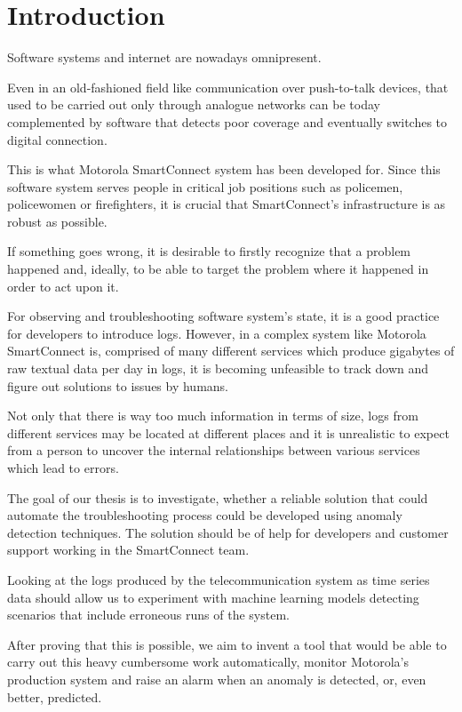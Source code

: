 
\chapter{Introduction}
\label{introduction}

Software systems and internet are nowadays omnipresent.

Even in an old-fashioned field like communication over push-to-talk devices, that used to be carried out only through analogue networks can be today complemented by software that detects poor coverage and eventually switches to digital connection. 

This is what Motorola SmartConnect system has been developed for. Since this software system serves people in critical job positions such as policemen, policewomen or firefighters, it is crucial that SmartConnect's infrastructure is as robust as possible.

If something goes wrong, it is desirable to firstly recognize that a problem happened and, ideally, to be able to target the problem where it happened in order to act upon it.

For observing and troubleshooting software system's state, it is a good practice for developers to introduce logs.
However, in a complex system like Motorola SmartConnect is, comprised of many different services which produce gigabytes of raw textual data per day in logs, it is becoming unfeasible to track down and figure out solutions to issues by humans.

Not only that there is way too much information in terms of size, logs from different services may be located at different places and it is unrealistic to expect from a person to uncover the internal relationships between various services which lead to errors.

The goal of our thesis is to investigate, whether a reliable solution that could automate the troubleshooting process could be developed using anomaly detection techniques. The solution should be of help for developers and customer support working in the SmartConnect team.

Looking at the logs produced by the telecommunication system as time series data should allow us to experiment with machine learning models detecting scenarios that include erroneous runs of the system.

After proving that this is possible, we aim to invent a tool that would be able to carry out this heavy cumbersome work automatically, monitor Motorola's production system and raise an alarm when an anomaly is detected, or, even better, predicted.

